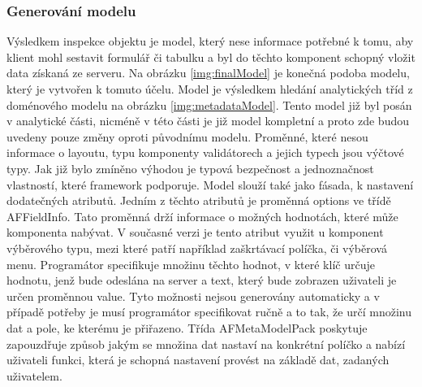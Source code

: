 \subsubsection{Generování modelu}
Výsledkem inspekce objektu je model, který nese informace potřebné k tomu, aby klient mohl sestavit formulář či tabulku a byl do těchto komponent schopný vložit data získaná ze serveru. Na obrázku \ref{img:finalModel} je konečná podoba modelu, který je vytvořen k tomuto účelu. Model je výsledkem hledání analytických tříd z doménového modelu na obrázku \ref{img:metadataModel}. Tento model již byl posán v analytické části, nicméně v této části je již model kompletní a proto zde budou uvedeny pouze změny oproti původnímu modelu. Proměnné, které nesou informace o layoutu, typu komponenty validátorech a jejich typech jsou výčtové typy. Jak již bylo zmíněno výhodou je typová bezpečnost a jednoznačnost vlastností, které framework podporuje. Model slouží také jako fásada, k nastavení dodatečných atributů. Jedním z těchto atributů je proměnná options ve třídě AFFieldInfo. Tato proměnná drží informace o možných hodnotách, které může komponenta nabývat. V současné verzi je tento atribut využit u komponent výběrového typu, mezi které patří například zaškrtávací políčka, či výběrová menu. Programátor specifikuje množinu těchto hodnot, v které klíč určuje hodnotu, jenž bude odeslána na server a text, který bude zobrazen uživateli je určen proměnnou value. Tyto možnosti nejsou generovány automaticky a v případě potřeby je musí programátor specifikovat ručně a to tak, že určí množinu dat a pole, ke kterému je přiřazeno. Třída AFMetaModelPack poskytuje zapouzdřuje způsob jakým se množina dat nastaví na konkrétní políčko a nabízí uživateli funkci, která je schopná nastavení provést na základě dat, zadaných uživatelem.

